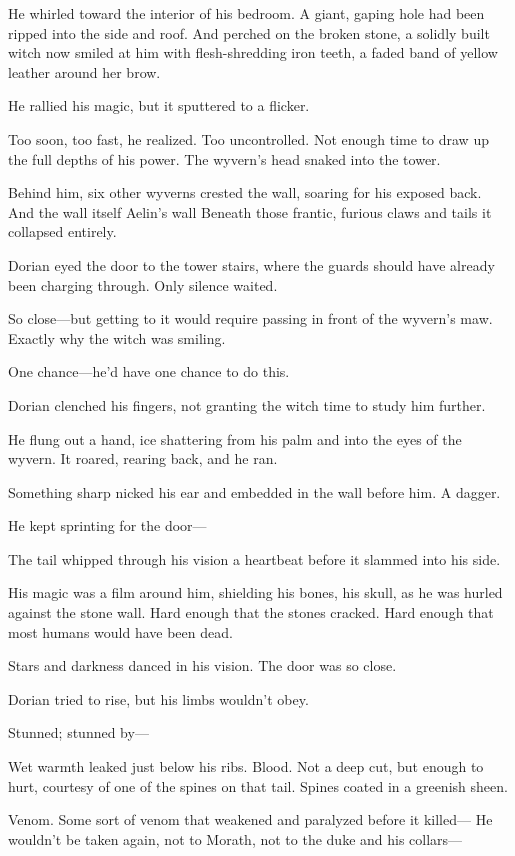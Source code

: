 He whirled toward the interior of his bedroom. A giant, gaping hole had been ripped into the side and roof. And perched on the broken stone, a solidly built witch now smiled at him with flesh-shredding iron teeth, a faded band of yellow leather around her brow.

He rallied his magic, but it sputtered to a flicker.

Too soon, too fast, he realized. Too uncontrolled. Not enough time to draw up the full depths of his power. The wyvern's head snaked into the tower.

Behind him, six other wyverns crested the wall, soaring for his exposed back. And the wall itself  Aelin's wall  Beneath those frantic, furious claws and tails  it collapsed entirely.

Dorian eyed the door to the tower stairs, where the guards should have already been charging through. Only silence waited.

So close---but getting to it would require passing in front of the wyvern's maw. Exactly why the witch was smiling.

One chance---he'd have one chance to do this.

Dorian clenched his fingers, not granting the witch time to study him further.

He flung out a hand, ice shattering from his palm and into the eyes of the wyvern. It roared, rearing back, and he ran.

Something sharp nicked his ear and embedded in the wall before him. A dagger.

He kept sprinting for the door---

The tail whipped through his vision a heartbeat before it slammed into his side.

His magic was a film around him, shielding his bones, his skull, as he was hurled against the stone wall. Hard enough that the stones cracked. Hard enough that most humans would have been dead.

Stars and darkness danced in his vision. The door was so close.

Dorian tried to rise, but his limbs wouldn't obey.

Stunned; stunned by---

Wet warmth leaked just below his ribs. Blood. Not a deep cut, but enough to hurt, courtesy of one of the spines on that tail. Spines coated in a greenish sheen.

Venom. Some sort of venom that weakened and paralyzed before it killed--- He wouldn't be taken again, not to Morath, not to the duke and his collars---

